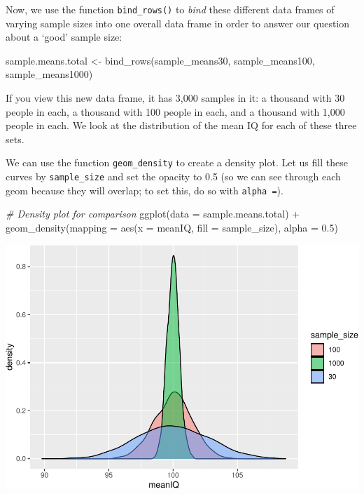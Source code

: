\documentclass[
]{book}
\newenvironment{Shaded}{\begin{snugshade}}{\end{snugshade}}
\newcommand{\AttributeTok}[1]{\textcolor[rgb]{0.77,0.63,0.00}{#1}}
\newcommand{\CommentTok}[1]{\textcolor[rgb]{0.56,0.35,0.01}{\textit{#1}}}
\newcommand{\FloatTok}[1]{\textcolor[rgb]{0.00,0.00,0.81}{#1}}
\newcommand{\FunctionTok}[1]{\textcolor[rgb]{0.00,0.00,0.00}{#1}}
\newcommand{\NormalTok}[1]{#1}
\newcommand{\OtherTok}[1]{\textcolor[rgb]{0.56,0.35,0.01}{#1}}
\newcommand{\SpecialCharTok}[1]{\textcolor[rgb]{0.00,0.00,0.00}{#1}}
\begin{document}
Now, we use the function \texttt{bind\_rows()} to \emph{bind} these different data frames of varying sample sizes into one overall data frame in order to answer our question about a `good' sample size:

\begin{Shaded}
\begin{Highlighting}[]
\NormalTok{sample.means.total }\OtherTok{\textless{}{-}} \FunctionTok{bind\_rows}\NormalTok{(sample\_means30, sample\_means100, sample\_means1000)}
\end{Highlighting}
\end{Shaded}

If you view this new data frame, it has 3,000 samples in it: a thousand with 30 people in each, a thousand with 100 people in each, and a thousand with 1,000 people in each. We look at the distribution of the mean IQ for each of these three sets.

We can use the function \texttt{geom\_density} to create a density plot. Let us fill these curves by \texttt{sample\_size} and set the opacity to 0.5 (so we can see through each geom because they will overlap; to set this, do so with \texttt{alpha\ =}).

\begin{Shaded}
\begin{Highlighting}[]
\CommentTok{\# Density plot for comparison }
\FunctionTok{ggplot}\NormalTok{(}\AttributeTok{data =}\NormalTok{ sample.means.total) }\SpecialCharTok{+} 
  \FunctionTok{geom\_density}\NormalTok{(}\AttributeTok{mapping =} \FunctionTok{aes}\NormalTok{(}\AttributeTok{x =}\NormalTok{ meanIQ, }\AttributeTok{fill =}\NormalTok{ sample\_size), }\AttributeTok{alpha =} \FloatTok{0.5}\NormalTok{) }
\end{Highlighting}
\end{Shaded}

\includegraphics{05-inferential-statistics_files/figure-latex/unnamed-chunk-24-1.pdf}
\end{document}
